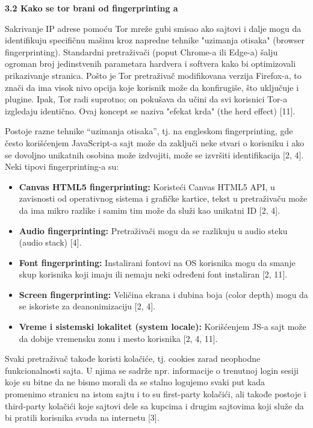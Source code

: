 \documentclass[
]{article}
\begin{document}
\protect\hypertarget{_Toc234141045}{}{}\textbf{3.2 Kako se tor brani od
fingerprinting a}

Sakrivanje IP adrese pomoću Tor mreže gubi smisao ako sajtovi i dalje
mogu da identifikuju specifičnu mašinu kroz napredne tehnike "uzimanja
otisaka" (browser fingerprinting). Standardni pretraživači (poput
Chrome-a ili Edge-a) šalju ogroman broj jedinstvenih parametara hardvera
i softvera kako bi optimizovali prikazivanje stranica. Pošto je Tor
pretraživač modifikovana verzija Firefox-a, to znači da ima visok nivo
opcija koje korisnik može da konfirugiše, što uključuje i plugine. Ipak,
Tor radi suprotno; on pokušava da učini da svi korisnici Tor-a izgledaju
identično. Ovaj koncept se naziva "efekat krda" (the herd effect)
{[}11{]}.

Postoje razne tehnike ``uzimanja otisaka'', tj. na engleskom
fingerprinting, gde često korišćenjem JavaScript-a sajt može da zaključi
neke stvari o korisniku i ako se dovoljno unikatnih osobina može
izdvojiti, može se izvršiti identifikacija {[}2, 4{]}. Neki tipovi
fingerprinting-a su:

\begin{itemize}
\item
  \textbf{Canvas HTML5 fingerprinting:} Koristeći Canvas HTML5 API, u
  zavisnosti od operativnog sistema i grafičke kartice, tekst u
  pretraživaču može da ima mikro razlike i samim tim može da služi kao
  unikatni ID {[}2, 4{]}.
\item
  \textbf{Audio fingerprinting:} Pretraživači mogu da se razlikuju u
  audio steku (audio stack) {[}4{]}.
\item
  \textbf{Font fingerprinting:} Instalirani fontovi na OS korisnika mogu
  da smanje skup korisnika koji imaju ili nemaju neki određeni font
  instaliran {[}2, 11{]}.
\item
  \textbf{Screen fingerprinting:} Veličina ekrana i dubina boja (color
  depth) mogu da se iskoriste za deanonimizaciju {[}2, 4{]}.
\item
  \textbf{Vreme i sistemski lokalitet (system locale):} Korišćenjem JS-a
  sajt može da dobije vremensku zonu i mesto korisnika {[}2, 4, 11{]}.
\end{itemize}

Svaki pretraživač takođe koristi kolačiće, tj. cookies zarad neophodne
funkcionalnosti sajta. U njima se sadrže npr. informacije o trenutnoj
login sesiji koje su bitne da ne bismo morali da se stalno logujemo
svaki put kada promenimo stranicu na istom sajtu i to su first-party
kolačići, ali takođe postoje i third-party kolačići koje sajtovi dele sa
kupcima i drugim sajtovima koji služe da bi pratili korisnika svuda na
internetu {[}3{]}.
\end{document}
